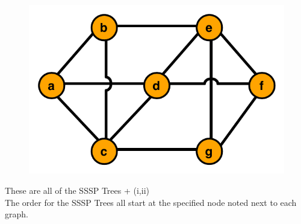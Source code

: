 \documentclass[12pt]{article}
\begin{document}
\begin{enumerate}
\begin{figure}[h!]
\begin{center}
\includegraphics[scale=0.7]{graph_mst.pdf} 
\end{center}
\end{figure}
These are all of the SSSP Trees + (i,ii)\\
The order for the SSSP Trees all start at the specified node noted next to each graph.\\


\end{enumerate}
\end{document}
